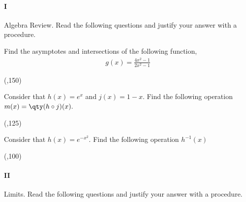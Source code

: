 
\paragraph{I} Algebra Review. Read the following questions and justify your answer with a procedure.

\begin{preguntas}


\pregunta[12] Find the asymptotes and intersections of the following function, 
\begin{gather*}
    g(x) = \frac{4x^2-1}{2x^2-1}
\end{gather*}

\begin{center}
    \framebox(\textwidth,150){}   
\end{center}


\pregunta[12] Consider that $h(x)=e^{x}$ and $j(x)=1-x$. 
Find the following operation \( m(x) = \qty(h\circ j)(x). \)

\begin{center}
    \framebox(\textwidth,125){} 
\end{center}


\newpage

\pregunta[13] Consider that $h(x)=e^{-x^2}$.
Find the following operation \(h^{-1}(x)\)
\begin{center}
    \framebox(\textwidth,100){} 
\end{center}

\end{preguntas}


\paragraph{II} Limits. Read the following questions and justify your answer with a procedure.


